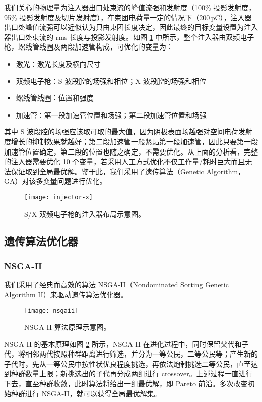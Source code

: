 我们关心的物理量为注入器出口处束流的峰值流强和发射度（100\% 投影发射度，95\% 投影发射度及切片发射度），在束团电荷量一定的情况下（200\,pC），注入器出口处峰值流强可以近似认为只由束团长度决定，因此最终的目标变量设置为注入器出口处束流的 rms 长度与投影发射度。如图 \ref{fig:injector-x} 中所示，整个注入器由双频电子枪，螺线管线圈及两段加速管构成，可优化的变量为：
\begin{itemize}
\item {\sf 激光}：激光长度及横向尺寸
\item {\sf 双频电子枪}：S 波段腔的场强和相位；X 波段腔的场强和相位
\item {\sf 螺线管线圈}：位置和强度
\item {\sf 加速管}：第一段加速管位置和场强；第二段加速管位置和场强
\end{itemize}
其中 S 波段腔的场强应该取可取的最大值，因为阴极表面场越强对空间电荷发射度增长的抑制效果就越好；第二段加速管一般紧贴第一段加速管，因此只要第一段加速管位置确定，第二段的位置也随之确定，不需要优化。从上面的分析看，完整的注入器需要优化 10 个变量，若采用人工方式优化不仅工作量/耗时巨大而且无法保证取到全局最优解。鉴于此，我们采用了遗传算法（Genetic Algorithm，GA）对该多变量问题进行优化。
\begin{figure}[htbp]
	\centering
	\texttt{[image: injector-x]}	
	\caption{S/X 双频电子枪的注入器布局示意图。}
	\label{fig:injector-x}
\end{figure}

\subsection{遗传算法优化器}
\subsubsection{NSGA-II}
我们采用了经典而高效的算法 NSGA-II（Nondominated Sorting Genetic Algorithm II）来驱动遗传算法优化器。
\begin{figure}[htbp]
	\centering
	\texttt{[image: nsgaii]}	
	\caption{NSGA-II 算法原理示意图。}
	\label{fig:nsgaii}
\end{figure}
NSGA-II 的基本原理如图 \ref{fig:nsgaii} 所示，NSGA-II 在进化过程中，同时保留父代和子代，将相邻两代按照种群距离进行筛选，并分为一等公民，二等公民等；产生新的子代时，先从一等公民中按性状优良程度挑选，再依法炮制挑选二等公民，直至达到种群数量上限；新挑选出的子代再分成两组进行 crossover。上述过程一直进行下去，直至种群收敛，此时算法将给出一组最优解，即 Pareto 前沿。多次改变初始种群进行 NSGA-II，就可以获得全局最优解集。

